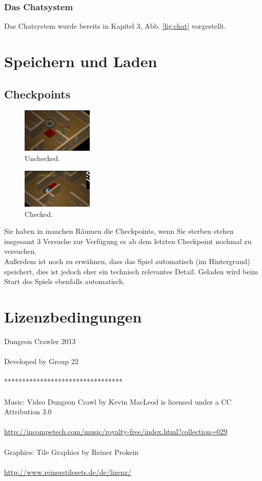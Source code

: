 \documentclass[12pt, a4paper]{scrreprt}
\begin{document}
\subsection*{Das Chatsystem}
Das Chatsystem wurde bereits in Kapitel 3, Abb. \ref{fig:chat} vorgestellt.
\chapter{Speichern und Laden}
\section*{Checkpoints}
\begin{figure}[h]
\includegraphics[width=0.3\textwidth]{img/checkpoint(unchecked)}
\caption{Unchecked.}
\end{figure}
\begin{figure}[h]
\includegraphics[width=0.3\textwidth]{img/checkpoint(checked)}
\caption{Checked.}
\end{figure}
Sie haben in manchen Räumen die Checkpoints, wenn Sie sterben stehen insgesamt 3 Versuche zur Verfügung es ab dem letzten Checkpoint nochmal zu versuchen.\\
Außerdem ist noch zu erwähnen, dass das Spiel automatisch (im Hintergrund) speichert, dies ist jedoch eher ein technisch relevantes Detail. Geladen wird beim Start des Spiels ebenfalls automatisch.
\chapter{Lizenzbedingungen}
Dungeon Crawler 2013\\\\
Developed by Group 22\\\\
*********************************\\\\
Music: Video Dungeon Crawl by Kevin MacLeod is licensed under a CC Attribution 3.0\\\\
\url{http://incompetech.com/music/royalty-free/index.html?collection=029}\\\\
Graphics: Tile Graphics by Reiner Prokein\\\\
\url{http://www.reinerstilesets.de/de/lizenz/}
\end{document}
